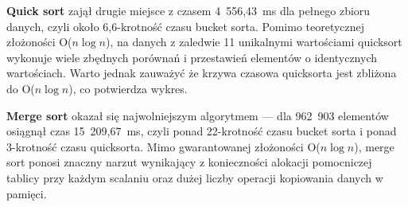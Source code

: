 \documentclass[12pt,a4paper,twocolumn]{article}
\begin{document}
\textbf{Quick sort} zajął drugie miejsce z czasem 4~556,43~ms dla
pełnego zbioru danych, czyli około 6,6-krotność czasu bucket sorta.
Pomimo teoretycznej złożoności O($n \log n$), na danych z zaledwie
11 unikalnymi wartościami quicksort wykonuje wiele zbędnych porównań
i przestawień elementów o identycznych wartościach. Warto jednak
zauważyć że krzywa czasowa quicksorta jest zbliżona do
O($n \log n$), co potwierdza wykres.

\textbf{Merge sort} okazał się najwolniejszym algorytmem ---
dla 962~903 elementów osiągnął czas 15~209,67~ms, czyli ponad
22-krotność czasu bucket sorta i ponad 3-krotność czasu quicksorta.
Mimo gwarantowanej złożoności O($n \log n$), merge sort ponosi
znaczny narzut wynikający z konieczności alokacji pomocniczej
tablicy przy każdym scalaniu oraz dużej liczby operacji kopiowania
danych w pamięci.
\end{document}

